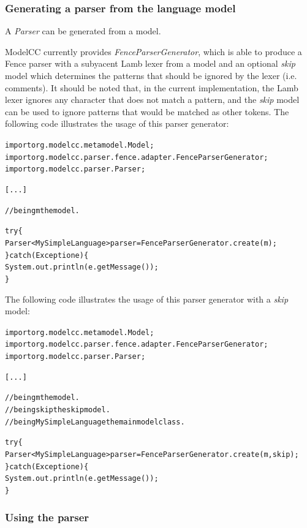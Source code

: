 \documentclass[a4paper,twoside,onecolumn]{article}
\newenvironment{colframe}{%
  \begin{Sbox} 
    \begin{minipage}{.8\columnwidth} 
}{%

  \end{minipage} 
  \end{Sbox} 
  \begin{center} 
    \fcolorbox{black}{MyGray}{\TheSbox} 
  \end{center} 
}
\begin{document}
\subsubsection{Generating a parser from the language model} \label{sec:genpar}

A \emph{Parser} can be generated from a model.

ModelCC currently provides \emph{FenceParserGenerator}, which is able to produce a Fence parser with a subyacent Lamb lexer from a model and an optional \emph{skip} model which determines the patterns that should be ignored by the lexer (i.e. comments). It should be noted that, in the current implementation, the Lamb lexer ignores any character that does not match a pattern, and the \emph{skip} model can be used to ignore patterns that would be matched as other tokens. The following code illustrates the usage of this parser generator:

\begin{colframe}
\begin{alltt}
import org.modelcc.metamodel.Model;
import org.modelcc.parser.fence.adapter.FenceParserGenerator;
import org.modelcc.parser.Parser;

[...]

//being m the model.

try \{
  Parser<MySimpleLanguage> parser = FenceParserGenerator.create(m);
\} catch (Exception e) \{
  System.out.println(e.getMessage());
\}
\end{alltt}
\end{colframe}

The following code illustrates the usage of this parser generator with a \emph{skip} model:

\begin{colframe}
\begin{alltt}
import org.modelcc.metamodel.Model;
import org.modelcc.parser.fence.adapter.FenceParserGenerator;
import org.modelcc.parser.Parser;

[...]

//being m the model.
//being skip the skip model.
//being MySimpleLanguage the main model class.

try \{
  Parser<MySimpleLanguage> parser = FenceParserGenerator.create(m,skip);
\} catch (Exception e) \{
  System.out.println(e.getMessage());
\}
\end{alltt}
\end{colframe}

\subsubsection{Using the parser} \label{sec:usepar}
\end{document}
